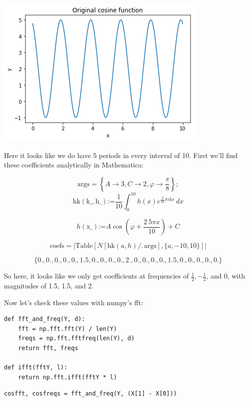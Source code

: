 \documentclass[11pt]{article}
\begin{document}
\includegraphics[width=.9\linewidth]{./obipy-resources/333Qyk.png}

Here it looks like we do have 5 periods in every interval of 10.
First we'll find these coefficients analytically in Mathematica: 

$$\text{args}=\left\{A\to 3,C\to 2,\varphi \to \frac{\pi }{8}\right\};$$
$$\text{hk}(\text{k$\_$},\text{h$\_$})\text{:=}\frac{1}{10} \int_0^{10} h(x)
e^{\frac{2}{10} \pi i k x} \, dx$$


$$h(\text{x$\_$})\text{:=}A \cos \left(\varphi +\frac{2\ 5 \pi  x}{10}\right)+C$$

$$\text{coefs}=\left| \text{Table}[N[\text{hk}(a,h)\text{/.}\,
\text{args}],\{a,-10,10\}]\right|$$

$$\{0.,0.,0.,0.,0.,1.5,0.,0.,0.,0.,2.,0.,0.,0.,0.,1.5,0.,0.,0.,0.,0.\}$$

So here, it looks like we only get coefficients at frequencies of $\frac{1}{2},
-\frac{1}{2}$, and $0$, with magnitudes of 1.5, 1.5, and 2.

Now let's check these values with numpy's fft:

\begin{verbatim}
def fft_and_freq(Y, d):
    fft = np.fft.fft(Y) / len(Y)
    freqs = np.fft.fftfreq(len(Y), d)
    return fft, freqs

def ifft(fftY, l):
    return np.fft.ifft(fftY * l)
\end{verbatim}


\begin{verbatim}
cosfft, cosfreqs = fft_and_freq(Y, (X[1] - X[0]))
\end{verbatim}
\end{document}
